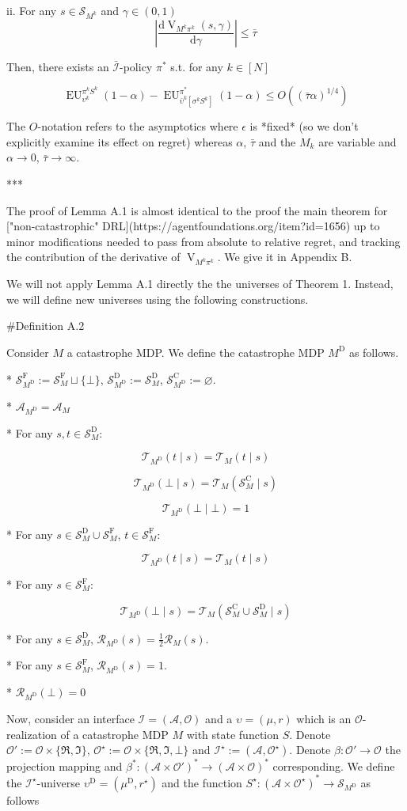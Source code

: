 \documentclass[a4paper]{article}
\newcommand{\AP}[1]{\left(#1\right)}
\newcommand{\AB}[1]{\left[#1\right]}
\newcommand{\D}{\mathrm{d}}
\newcommand{\Abs}[1]{\left\vert #1 \right\vert}
\newcommand{\Ob}{\mathcal{O}}
\newcommand{\A}{\mathcal{A}}
\newcommand{\St}{\mathcal{S}}
\newcommand{\T}{\mathcal{T}}
\newcommand{\R}{\mathcal{R}}
\newcommand{\In}{\mathcal{I}}
\newcommand{\Adi}{{\bar{\In}}}
\newcommand{\RMC}{\mathrm{C}}
\newcommand{\RMD}{\mathrm{D}}
\newcommand{\RMF}{\mathrm{F}}
\newcommand{\SF}{\St^{\RMF}}
\newcommand{\SD}{\St^{\RMD}}
\newcommand{\SC}{\St^{\RMC}}
\newcommand{\MD}{M^{\RMD}}
\newcommand{\UD}{\upsilon^{\RMD}}
\newcommand{\V}{\operatorname{V}}
\newcommand{\EU}{\operatorname{EU}}
\begin{document}
ii. For any $s \in \St_{M^k}$ and $\gamma\in(0,1)$ $$\Abs{\frac{\D\V_{M^k\pi^k}(s,\gamma)}{\D\gamma}} \leq \bar{\tau}$$

Then, there exists an $\Adi$-policy $\pi^*$ s.t. for any $k \in [N]$

$$\EU_{\upsilon^k}^{\pi^k S^k}(1-\alpha) - \EU_{\bar{\upsilon}^k\AB{\sigma^k S^k}}^{\pi^*}(1-\alpha) \leq O\AP{(\bar{\tau} \alpha)^{1/4}}$$

The $O$-notation refers to the asymptotics where $\epsilon$ is *fixed* (so we don't explicitly examine its effect on regret) whereas $\alpha$, $\bar{\tau}$ and the $M_k$ are variable and $\alpha \rightarrow 0$, $\bar{\tau} \rightarrow \infty$.

***

The proof of Lemma A.1 is almost identical to the proof the main theorem for ["non-catastrophic" DRL](https://agentfoundations.org/item?id=1656) up to minor modifications needed to pass from absolute to relative regret, and tracking the contribution of the derivative of $\V_{M^k\pi^k}$. We give it in Appendix B.

We will not apply Lemma A.1 directly the the universes of Theorem 1. Instead, we will define new universes using the following constructions.

\#Definition A.2

Consider $M$ a catastrophe MDP. We define the catastrophe MDP $\MD$ as follows.

* $\SF_{\MD}:=\SF_M \sqcup \{\bot\}$, $\SD_{\MD}:=\SD_M$, $\SC_{\MD}:=\varnothing$.

* $\A_{\MD} = \A_M$

* For any $s,t \in \SD_M$:

$$\T_{\MD}(t \mid s) = \T_M(t \mid s)$$

$$\T_{\MD}(\bot \mid s) = \T_M(\SC_M \mid s)$$

$$\T_{\MD}(\bot \mid \bot) = 1$$

* For any $s \in \SD_M \cup \SF_M$, $t \in \SF_M$:

$$\T_{\MD}(t \mid s) = \T_M(t \mid s)$$

* For any $s \in \SF_M$:

$$\T_{\MD}(\bot \mid s) = \T_M(\SC_M \cup \SD_M \mid s)$$

* For any $s \in \SD_M$, $\R_{\MD}(s) = \frac{1}{2}\R_M(s)$.

* For any $s \in \SF_M$, $\R_{\MD}(s) = 1$.

* $\R_{\MD}(\bot) = 0$

Now, consider an interface $\In=(\A,\Ob)$ and a $\upsilon=(\mu,r)$ which is an $\Ob$-realization of a catastrophe MDP $M$ with state function $S$. Denote $\Ob':=\Ob\times\{\Re,\Im\}$, $\Ob^\star:=\Ob \times \{\Re,\Im,\bot\}$ and $\In^\star:=(\A,\Ob^\star)$. Denote $\beta: \Ob' \rightarrow \Ob$ the projection mapping and $\beta^*: \AP{\A \times \Ob'}^* \rightarrow \AP{\A \times \Ob}^*$ corresponding. We define the $\In^\star$-universe $\UD=(\mu^\RMD,r^\star)$ and the function $S^\star: \AP{\A \times \Ob^\star}^* \rightarrow \St_{\MD}$ as follows
\end{document}

